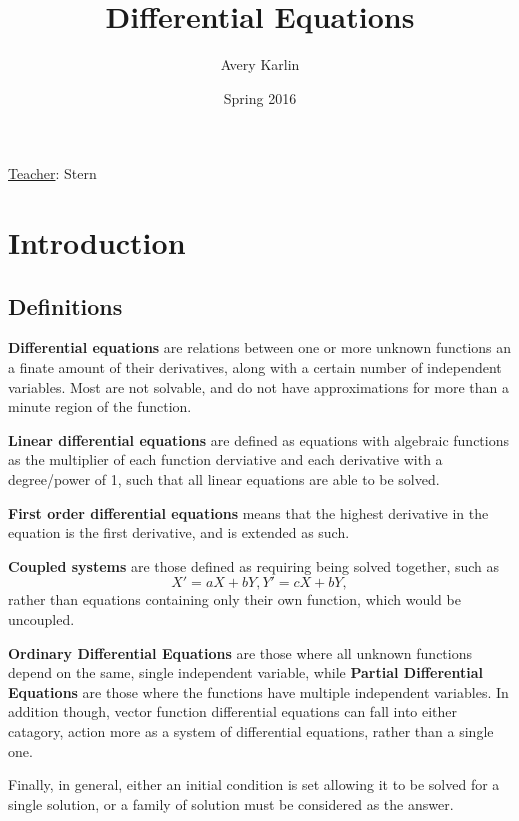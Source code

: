 \documentclass[11 pt, twoside]{article}
\begin{document}
\title{Differential Equations}
\author{Avery Karlin}
\date{Spring 2016}
\newcommand{\teacher}{Stern}

\maketitle
\newpage
\hypertarget{content}{\tableofcontents}
\vspace{11pt}
\noindent
\underline{Teacher}: \teacher
\newpage

\section{Introduction}

\subsection{Definitions}

\textbf{Differential equations} are relations between one or more unknown functions an a finate amount of their derivatives, along with a certain number of independent variables. Most are not solvable, and do not have approximations for more than a minute region of the function.

\textbf{Linear differential equations} are defined as equations with algebraic functions as the multiplier of each function derviative and each derivative with a degree/power of 1, such that all linear equations are able to be solved.

\textbf{First order differential equations} means that the highest derivative in the equation is the first derivative, and is extended as such.

\textbf{Coupled systems} are those defined as requiring being solved together, such as $$X' = aX + bY, Y' = cX + bY,$$ rather than equations containing only their own function, which would be uncoupled.

\textbf{Ordinary Differential Equations} are those where all unknown functions depend on the same, single independent variable, while \textbf{Partial Differential Equations} are those where the functions have multiple independent variables. In addition though, vector function differential equations can fall into either catagory, action more as a system of differential equations, rather than a single one.

Finally, in general, either an initial condition is set allowing it to be solved for a single solution, or a family of solution must be considered as the answer.
\end{document}
